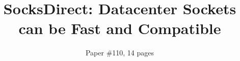 \documentclass[sigconf,10pt]{acmart}
\renewcommand\footnotetextcopyrightpermission[1]{} %
\begin{document}
\pagestyle{plain} %

\date{}

\title{\huge SocksDirect: Datacenter Sockets can be Fast and Compatible}

\author{{Paper \#110, 14 pages}}%

\maketitle

\newcommand{\specialcell}[2][c]{%
  \begin{tabular}[#1]{@{}c@{}}#2\end{tabular}}





%


%


%



\small 
\balance


\end{document}
